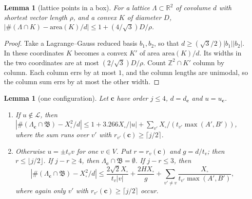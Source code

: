 \documentclass[11pt]{amsart}
\newtheorem{lemma}[theorem]{Lemma}
\theoremstyle{definition}
\newcommand{\Z}{\mathbb{Z}}
\newcommand{\R}{\mathbb{R}}
\newcommand{\Xb}{X_{\square}}
\begin{document}
\begin{lemma}[lattice points in a box]\label{lem:L}
For a lattice $\Lambda\subset\R^2$ of covolume $d$ with shortest vector length $\rho$, and a
convex $K$ of diameter $D$,
$|\#(\Lambda\cap K)-\mathrm{area}(K)/d|\le1+(4/\sqrt3)D/\rho$.
\end{lemma}
\begin{proof}
Take a Lagrange--Gauss reduced basis $b_1,b_2$, so that $d\ge(\sqrt3/2)|b_1||b_2|$. In these
coordinates $K$ becomes a convex $K'$ of area $\mathrm{area}(K)/d$. Its widths in the two
coordinates are at most $(2/\sqrt3)D/\rho$. Count $\Z^2\cap K'$ column by column. Each column
errs by at most $1$, and the column lengths are unimodal, so the column sum errs by at most the
other width.
\end{proof}

\begin{lemma}[one configuration]\label{lem:conf}
Let $\mathbf c$ have order $j\le4$, $d=d_{\mathbf c}$ and $u=u_{\mathbf c}$.
\begin{enumerate}[label=(\roman*)]
\item If $u\notin\mathcal L$, then
  $|\#(\Lambda_{\mathbf c}\cap\mathfrak B)-\Xb^2/d|\le1+3.266\Xb/|u|+\sum_{v'}\Xb/(t_{v'}\max(A',B'))$,
  where the sum runs over $v'$ with $r_{v'}(\mathbf c)\ge\lceil j/2\rceil$.
\item Otherwise $u=\pm t_v v$ for one $v\in V$. Put $r=r_v(\mathbf c)$ and $g=d/t_v$; then
  $r\le\lfloor j/2\rfloor$. If $j-r\ge4$, then $\Lambda_{\mathbf c}\cap\mathfrak B=\emptyset$. If
  $j-r\le3$, then
  \[
  |\#(\Lambda_{\mathbf c}\cap\mathfrak B)-\Xb^2/d|\le\frac{2\sqrt2\Xb}{t_v|v|}+\frac{2H\Xb}{g}
  +\sum_{v'\ne v}\frac{\Xb}{t_{v'}\max(A',B')},
  \]
  where again only $v'$ with $r_{v'}(\mathbf c)\ge\lceil j/2\rceil$ occur.
\end{enumerate}
\end{lemma}
\end{document}
